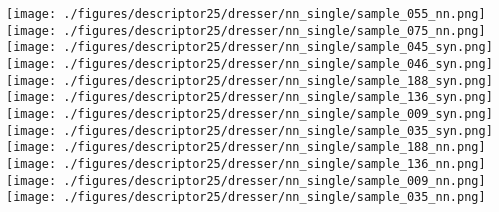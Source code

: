 \documentclass[10pt,twocolumn,letterpaper]{article}
\begin{document}
\begin{figure*}[h]
     \texttt{[image: ./figures/descriptor25/dresser/nn\_single/sample\_055\_nn.png]}          \hspace{-1mm}  
      \texttt{[image: ./figures/descriptor25/dresser/nn\_single/sample\_075\_nn.png]}         
    \texttt{[image: ./figures/descriptor25/dresser/nn\_single/sample\_045\_syn.png]}          \hspace{-1mm} 
     \texttt{[image: ./figures/descriptor25/dresser/nn\_single/sample\_046\_syn.png]}          \hspace{-1mm} 
     \texttt{[image: ./figures/descriptor25/dresser/nn\_single/sample\_188\_syn.png]}          \hspace{-1mm} 
     \texttt{[image: ./figures/descriptor25/dresser/nn\_single/sample\_136\_syn.png]}          \hspace{-1mm} 
     \texttt{[image: ./figures/descriptor25/dresser/nn\_single/sample\_009\_syn.png]}          \hspace{-1mm}  
     \texttt{[image: ./figures/descriptor25/dresser/nn\_single/sample\_035\_syn.png]}          
      \texttt{[image: ./figures/descriptor25/dresser/nn\_single/sample\_188\_nn.png]}          \hspace{-1mm} 
     \texttt{[image: ./figures/descriptor25/dresser/nn\_single/sample\_136\_nn.png]}          \hspace{-1mm} 
     \texttt{[image: ./figures/descriptor25/dresser/nn\_single/sample\_009\_nn.png]}          \hspace{-1mm} 
     \texttt{[image: ./figures/descriptor25/dresser/nn\_single/sample\_035\_nn.png]}          \hspace{-1mm} \\

\end{figure*}
\end{document}
